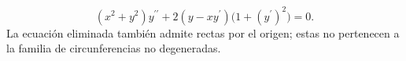 \[(x^2+y^2)y^{\prime\prime}+2(y-xy^{\prime})\bigl(1+(y^{\prime})^2\bigr)=0.\] La ecuación eliminada también admite rectas por el origen; estas no pertenecen a la familia de circunferencias no degeneradas.
